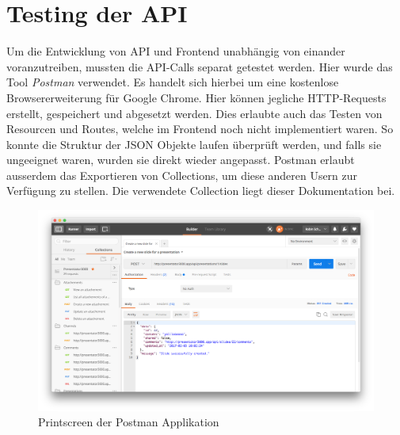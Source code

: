 \section{Testing der API}
Um die Entwicklung von API und Frontend unabhängig von einander voranzutreiben, mussten die API-Calls separat getestet werden. Hier wurde das Tool \emph{Postman} verwendet. Es handelt sich hierbei um eine kostenlose Browsererweiterung für Google Chrome. Hier können jegliche HTTP-Requests erstellt, gespeichert und abgesetzt werden. Dies erlaubte auch das Testen von Resourcen und Routes, welche im Frontend noch nicht implementiert waren. So konnte die Struktur der JSON Objekte laufen überprüft werden, und falls sie ungeeignet waren, wurden sie direkt wieder angepasst. Postman erlaubt ausserdem das Exportieren von Collections, um diese anderen Usern zur Verfügung zu stellen. Die verwendete Collection liegt dieser Dokumentation bei.

\begin{figure}[H]
	\centering
    \includegraphics[width=1\textwidth]{images/printscreen-postman.png}
    \caption{Printscreen der Postman Applikation}
\end{figure}